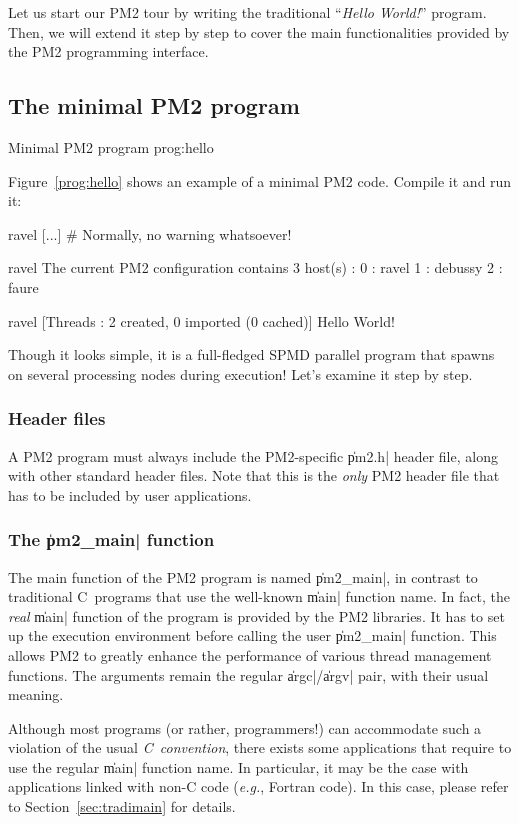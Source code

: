 Let us start our PM2 tour by writing the traditional ``\emph{Hello
  World!}'' program. Then, we will extend it step by step to cover the
main functionalities provided by the PM2 programming interface.

\subsection{The minimal PM2 program}

 {Minimal PM2 program} {prog:hello}

Figure~\ref{prog:hello} shows an
example of a minimal PM2 code. Compile it and run it:
\begin{shell}
ravel%
[...]   # Normally, no warning whatsoever!

ravel%
The current PM2 configuration contains 3 host(s) :
0 : ravel
1 : debussy
2 : faure

ravel%
[Threads : 2 created, 0 imported (0 cached)]
Hello World!
\end{shell}
Though it looks simple, it is a full-fledged SPMD parallel program
that spawns on several processing nodes during execution! Let's
examine it step by step.

\subsubsection{Header files}

A PM2 program must always include the PM2-specific \|pm2.h| header
file, along with other standard header files.  Note that this is the
\emph{only} PM2 header file that has to be included by user
applications.

\subsubsection{The \|pm2_main| function}

The main function of the PM2 program is named \|pm2_main|, in contrast
to traditional C~programs that use the well-known \|main|
function name. In fact, the \emph{real} \|main| function of the
program is provided by the PM2 libraries. It has to set up the
execution environment before calling the user \|pm2_main| function.
This allows PM2 to greatly enhance the performance of various thread
management functions.  The arguments remain the regular
\|argc|/\|argv| pair, with their usual meaning.

Although most programs (or rather, programmers!) can accommodate such a
violation of the usual \emph{C~convention}, there exists some
applications that require to use the regular \|main| function name. In
particular, it may be the case with applications linked with non-C
code (\emph{e.g.}, Fortran code).  In this case, please refer to
Section~\ref{sec:tradimain} for details.

